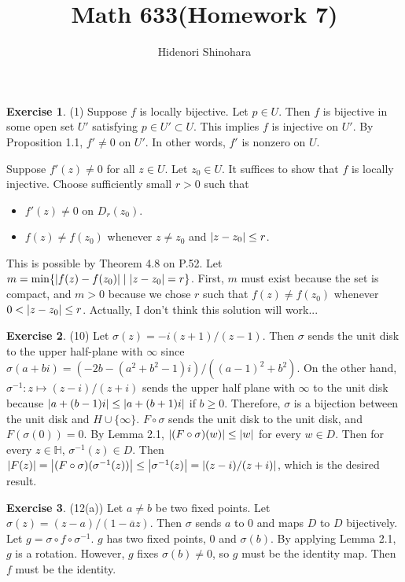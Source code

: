 \documentclass[12pt, psamsfonts]{amsart}
\theoremstyle{definition}
\newtheorem*{exer}{Exercise}
\theoremstyle{remark}
\numberwithin{equation}{section}
\begin{document}
\title{Math 633(Homework 7)}
\author{Hidenori Shinohara}
\maketitle

\begin{exer}{(1)}
  Suppose $f$ is locally bijective.
  Let $p \in U$.
  Then $f$ is bijective in some open set $U'$ satisfying $p \in U' \subset U$.
  This implies $f$ is injective on $U'$.
  By Proposition 1.1, $f' \ne 0$ on $U'$.
  In other words, $f'$ is nonzero on $U$.

  Suppose $f'(z) \ne 0$ for all $z \in U$.
  Let $z_0 \in U$.
  It suffices to show that $f$ is locally injective.
  Choose sufficiently small $r > 0$ such that
  \begin{itemize}
    \item
      $f'(z) \ne 0$ on $D_r(z_0)$.
    \item
      $f(z) \ne f(z_0)$ whenever $z \ne z_0$ and $\abs{z - z_0} \leq r$.
  \end{itemize}
  This is possible by Theorem 4.8 on P.52.
  Let $m = \min\{ \abs{f(z) - f(z_0)} \mid \abs{z - z_0} = r \}$.
  First, $m$ must exist because the set is compact, and $m > 0$ because we chose $r$ such that $f(z) \ne f(z_0)$ whenever $0 < \abs{z - z_0} \leq r$.
  Actually, I don't think this solution will work...
\end{exer}

\begin{exer}{(10)}
  Let $\sigma(z) = -i(z + 1) / (z - 1)$.
  Then $\sigma$ sends the unit disk to the upper half-plane with $\infty$ since
  $\sigma(a + bi) = (-2b - (a^2 + b^2 - 1)i) / ((a - 1)^2 + b^2)$.
  On the other hand, $\sigma^{-1}: z \mapsto (z - i) / (z + i)$ sends the upper half plane with $\infty$ to the unit disk because $\abs{a + (b - 1)i} \leq \abs{a + (b + 1)i}$ if $b \geq 0$.
  Therefore, $\sigma$ is a bijection between the unit disk and $H \cup \{ \infty \}$.
  $F \circ \sigma$ sends the unit disk to the unit disk, and $F(\sigma(0)) = 0$.
  By Lemma 2.1, $\abs{(F \circ \sigma)(w)} \leq \abs{w}$ for every $w \in D$.
  Then for every $z \in \mathbb{H}$, $\sigma^{-1}(z) \in D$.
  Then $\abs{F(z)} = \abs{(F \circ \sigma)(\sigma^{-1}(z))} \leq \abs{\sigma^{-1}(z)} = \abs{(z - i) / (z + i)}$, which is the desired result.
\end{exer}

\begin{exer}{(12(a))}
  Let $a \ne b$ be two fixed points.
  Let $\sigma(z) = (z - a) / (1 - \overline{a}z)$.
  Then $\sigma$ sends $a$ to $0$ and maps $D$ to $D$ bijectively.
  Let $g = \sigma \circ f \circ \sigma^{-1}$.
  $g$ has two fixed points, 0 and $\sigma(b)$.
  By applying Lemma 2.1, $g$ is a rotation.
  However, $g$ fixes $\sigma(b) \ne 0$, so $g$ must be the identity map.
  Then $f$ must be the identity.
\end{exer}
\end{document}
